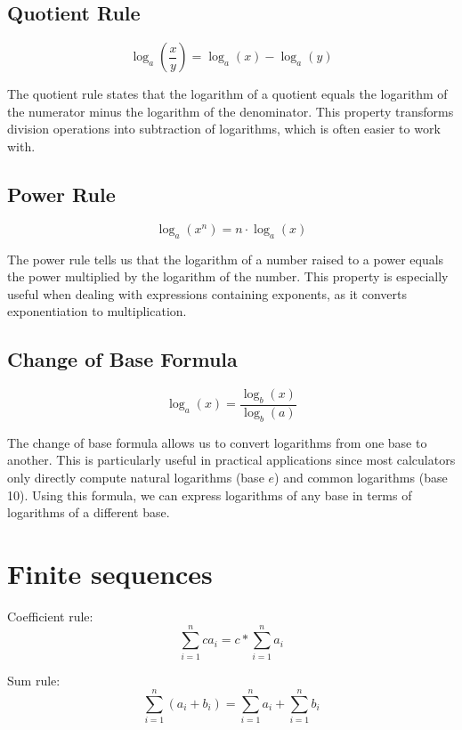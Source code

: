 \documentclass{article}
\begin{document}
\subsection*{Quotient Rule}
\begin{equation}
\log_a\left(\frac{x}{y}\right) = \log_a(x) - \log_a(y)
\end{equation}

The quotient rule states that the logarithm of a quotient equals the logarithm of the numerator minus the logarithm of the denominator. This property transforms division operations into subtraction of logarithms, which is often easier to work with.

\subsection*{Power Rule}
\begin{equation}
\log_a(x^n) = n \cdot \log_a(x)
\end{equation}

The power rule tells us that the logarithm of a number raised to a power equals the power multiplied by the logarithm of the number. This property is especially useful when dealing with expressions containing exponents, as it converts exponentiation to multiplication.

\subsection*{Change of Base Formula}
\begin{equation}
\log_a(x) = \frac{\log_b(x)}{\log_b(a)}
\end{equation}

The change of base formula allows us to convert logarithms from one base to another. This is particularly useful in practical applications since most calculators only directly compute natural logarithms (base $e$) and common logarithms (base 10). Using this formula, we can express logarithms of any base in terms of logarithms of a different base.

\section{Finite sequences}
Coefficient rule:
\begin{equation}
  \sum_{i=1}^{n} ca_i = c * \sum_{i=1}^{n} a_i
\end{equation}

Sum rule:
\begin{equation}
  \sum_{i=1}^{n} (a_i+b_i) = \sum_{i=1}^{n} a_i + \sum_{i=1}^{n} b_i
\end{equation}
\end{document}
